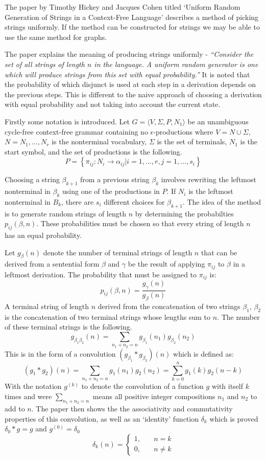   The paper by Timothy Hickey and Jacques Cohen titled `Uniform Random Generation of Strings in a Context-Free Language' describes a method of picking strings uniformly. If the method can be constructed for strings we may be able to use the same method for graphs.

  The paper explains the meaning of producing strings uniformly - \emph{``Consider the set of all strings of length $n$ in the language. A uniform random generator is one which will produce strings from this set with equal probability.''} It is noted that the probability of which disjunct is used at each step in a derivation depends on the previous steps. This is different to the naive approach of choosing a derivation with equal probability and not taking into account the current state.

  Firstly some notation is introduced. Let $G = \langle V, \Sigma, P, N_1 \rangle$ be an unambiguous cycle-free context-free grammar containing no $\epsilon$-productions where $V = N \cup \Sigma$, $N = {N_1,\dots,N_r}$ is the nonterminal vocabulary, $\Sigma$ is the set of terminals, $N_1$ is the start symbol, and the set of productions is the following.
  \[P = \left\{\pi_{ij} : N_i \to \alpha_{ij} | i = 1,\dots,r, j = 1, \dots,s_i \right\}\]

  Choosing a string $\beta_{k+1}$ from a previous string $\beta_k$ involves rewriting the leftmost nonterminal in $\beta_k$ using one of the productions in $P$. If $N_i$ is the leftmost nonterminal in $B_k$, there are $s_i$ different choices for $\beta_{k+1}$. The idea of the method is to generate random strings of length $n$ by determining the probabilties $p_{ij}(\beta, n)$. These probabilities must be chosen so that every string of length $n$ has an equal probability.

  Let $g_\beta(n)$ denote the number of terminal strings of length $n$ that can be derived from a sentential form $\beta$ and $\gamma$ be the result of applying $\pi_{ij}$ to $\beta$ in a leftmost derivation. The probability that must be assigned to $\pi_{ij}$ is:
  \[
  p_{ij}(\beta, n) = \frac{g_\gamma(n)}{g_\beta(n)}
  \]
  A terminal string of length $n$ derived from the concatenation of two strings $\beta_1$, $\beta_2$ is the concatenation of two terminal strings whose lengths sum to $n$. The number of these terminal strings is the following.
  \[
  g_{\beta_1\beta_2}(n) = \sum_{n_1+n_2=n}g_{\beta_1}(n_1)g_{\beta_2}(n_2)
  \]
  This is in the form of a convolution $(g_{\beta_1} * g_{\beta_2})(n)$ which is defined as:
  \[
  (g_1 * g_2)(n) = \sum_{n_1+n_2=n}g_1(n_1)g_2(n_2) = \sum_{k=0}^{n} g_1(k)g_2(n-k)
  \]
  With the notation $g^{(k)}$ to denote the convolution of a function $g$ with itself $k$ times and were $\sum_{n_1+n_2=n}$ means all positive integer compositions $n_1$ and $n_2$ to add to $n$. The paper then shows the the associativity and commutativity properties of this convolution, as well as an `identity' function $\delta_k$ which is proved $\delta_0 * g = g$ and $g^{(0)} = \delta_0$
  \[
  \delta_k(n) = \left\{\begin{aligned}
    1, \quad & n = k\\
    0, \quad & n \neq k
  \end{aligned}\right.
  \]


